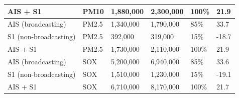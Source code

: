 \begin{table}[!h]
\begin{tabular}[t]{l|l|l|l|l|l}
\hline
AIS + S1 & PM10 & 1,880,000 & 2,300,000 & 100\% & 21.9\\
\hline
AIS (broadcasting) & PM2.5 & 1,340,000 & 1,790,000 & 85\% & 33.7\\
\hline
S1 (non-broadcasting) & PM2.5 & 392,000 & 319,000 & 15\% & -18.7\\
\hline
AIS + S1 & PM2.5 & 1,730,000 & 2,110,000 & 100\% & 21.9\\
\hline
AIS (broadcasting) & SOX & 5,200,000 & 6,940,000 & 85\% & 33.6\\
\hline
S1 (non-broadcasting) & SOX & 1,510,000 & 1,230,000 & 15\% & -19.1\\
\hline
AIS + S1 & SOX & 6,710,000 & 8,170,000 & 100\% & 21.7\\
\hline
\end{tabular}
\end{table}

